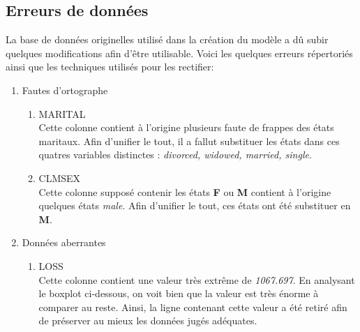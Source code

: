 \documentclass{article}\usepackage[]{graphicx}\usepackage[]{color}
\begin{document}
\begin{appendices}
\section{Erreurs de données}
\label{annex:error}
La base de données originelles utilisé dans la création du modèle a dû subir quelques modifications afin d'être utilisable. Voici les quelques erreurs répertoriés ainsi que les techniques utilisés pour les rectifier:
\begin{enumerate}
\item Fautes d'ortographe
\begin{enumerate}
\item MARITAL\\
Cette colonne contient à l'origine plusieurs faute de frappes des états maritaux. Afin d'unifier le tout, il a fallut substituer les états dans ces quatres variables distinctes : \textit{divorced, widowed, married, single}.
\item CLMSEX\\
Cette colonne supposé contenir les états \textbf{F} ou \textbf{M} contient à l'origine quelques états \textit{male}. Afin d'unifier le tout, ces états ont été substituer en \textbf{M}.
\end{enumerate}
\item Données aberrantes
\begin{enumerate}
\item LOSS\\
Cette colonne contient une valeur très extrême de \textit{1067.697}. En analysant le boxplot ci-dessous, on voit bien que la valeur est très énorme à comparer au reste. Ainsi, la ligne contenant cette valeur a été retiré afin de préserver au mieux les données jugés adéquates.\\


\end{enumerate}
\end{enumerate}
\end{appendices}
\end{document}

